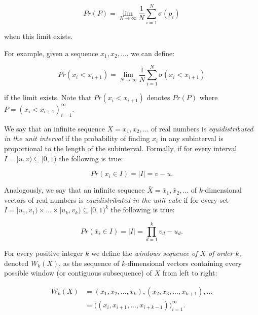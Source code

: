 \documentclass[11pt,a4paper]{tesis}
\theoremstyle{plain}
\theoremstyle{definition}
\begin{document}
\begin{equation*}
  Pr(P) = \lim_{N \to \infty} \frac{1}{N} \sum_{i = 1}^{N} \sigma(p_i)
\end{equation*}

when this limit exists.

For example, given a sequence $x_1, x_2, \dots$, we can define:

\begin{equation*}
  Pr(x_i < x_{i+1}) = \lim_{N \to \infty} \frac{1}{N} \sum_{i = 1}^{N} \sigma(x_i < x_{i+1})
\end{equation*}

if the limit exists. Note that $Pr(x_i < x_{i+1})$ denotes $Pr(P)$ where $P = (x_i < x_{i+1})_{i = 1}^{\infty}$.

We say that an infinite sequence $X = x_1, x_2, \dots$ of real numbers is \textit{equidistributed in the unit interval} if the probability of finding $x_i$ in any subinterval is proportional to the length of the subinterval. Formally, if for every interval $I = [u, v) \subseteq [0, 1)$ the following is true:

\begin{equation*}
  Pr(x_i \in I) = |I| = v - u \text{.}
\end{equation*}


Analogously, we say that an infinite sequence $\bar{X} = \bar{x}_1, \bar{x}_2, \dots$ of $k$-dimensional vectors of real numbers is \textit{equidistributed in the unit cube} if for every set $I = [u_1, v_1)  \times \dots \times [u_k, v_k) \subseteq [0, 1)^k$ the following is true:

\begin{equation*}
  Pr(\bar{x}_i \in I) = |I| = \prod_{d = 1}^{k} v_d - u_d \text{.}
\end{equation*}

For every positive integer $k$ we define the \textit{windows sequence of $X$ of order $k$}, denoted $W_k(X)$, as the sequence of $k$-dimensional vectors containing every possible window (or contiguous subsequence) of $X$ from left to right:

\begin{equation}\label{equation:windows-sequence}
  \begin{aligned}
    W_k(X) & = (x_1, x_2, \dots, x_k), (x_2, x_3, \dots, x_{k + 1}), \dots \\
             & = \big( (x_i, x_{i + 1}, \dots, x_{i + k - 1}) \big)_{i = 1}^{\infty} \text{.}
  \end{aligned}
\end{equation}
\end{document}
